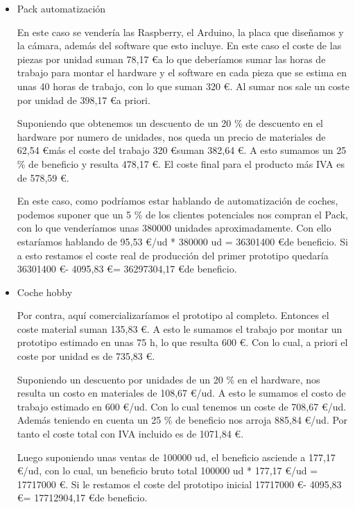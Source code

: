 \documentclass{pclass}
\begin{document}
	\begin{itemize}
		\item Pack automatización
		
			En este caso se vendería las Raspberry, el Arduino, la placa que diseñamos y la cámara, además del software que esto incluye. En este caso el coste de las piezas por unidad suman 78,17 \euro a lo que deberíamos sumar las horas de trabajo para montar el hardware y el software en cada pieza que se estima en unas 40 horas de trabajo, con lo que suman 320 \euro. Al sumar nos sale un coste por unidad de 398,17 \euro a priori. 
			
			 Suponiendo que obtenemos un descuento de un 20 \% de descuento en el hardware por numero de unidades, nos queda un precio de materiales de 62,54 \euro más el coste del trabajo 320 \euro suman 382,64 \euro. A esto sumamos un 25 \% de beneficio y resulta 478,17 \euro. El coste final para el producto más IVA es de 578,59 \euro.
			 
			 En este caso, como podríamos estar hablando de automatización de coches, podemos suponer que un 5 \% de los clientes potenciales nos compran el Pack, con lo que venderíamos unas 380000 unidades aproximadamente. Con ello estaríamos hablando de 95,53 \euro/ud * 380000 ud = 36301400 \euro  de beneficio. Si a esto restamos el coste real de producción del primer prototipo quedaría 36301400 \euro  -  4095,83 \euro = 36297304,17 \euro  de beneficio.
			
		\item Coche hobby
		
			Por contra, aquí comercializaríamos el prototipo al completo. Entonces el coste material suman 135,83 \euro. A esto le sumamos el trabajo por montar un prototipo estimado en unas 75 h, lo que resulta 600 \euro. Con lo cual, a priori el coste por unidad es de 735,83 \euro.
			
			Suponiendo un descuento por unidades de un 20 \% en el hardware, nos resulta un costo en materiales de 108,67 \euro/ud. A esto le sumamos el costo de trabajo estimado en 600 \euro/ud. Con lo cual tenemos un coste de 708,67 \euro/ud. Además teniendo en cuenta un 25 \% de beneficio nos arroja 885,84 \euro/ud. Por tanto el coste total con IVA incluido es de 1071,84 \euro.
			
			Luego suponiendo unas ventas de 100000 ud, el beneficio asciende a 177,17 \euro/ud, con lo cual, un beneficio bruto total 100000 ud * 177,17 \euro/ud = 17717000 \euro. Si le restamos el coste del prototipo inicial 17717000 \euro - 4095,83 \euro = 17712904,17 \euro de beneficio.
		
	\end{itemize}
 
\end{document}
